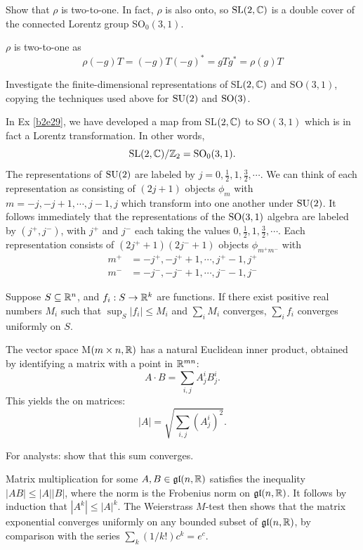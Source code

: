 \documentclass[10pt]{article}
\begin{document}
\begin{example}
	Show that $\rho$ is two-to-one. In fact, $\rho$ is also onto, so $\text{SL}(2,\mathbb{C})$ is a double cover of the connected Lorentz group SO$_0(3,1)$.
\end{example}
\sol $\rho$ is two-to-one as
$$
\rho(-g)T = (-g)T(-g)^* = gTg^* = \rho(g)T
$$


\begin{example}
	Investigate the finite-dimensional representations of SL$(2,\mathbb{C})$ and SO$(3,1)$, copying the techniques used above for $\text{SU}(2)$ and $\text{SO}(3)$.
\end{example}
\sol In Ex \ref{b2e29}, we have developed a map from SL$(2,\mathbb{C})$ to SO$(3,1)$ which is in fact a Lorentz transformation. In other words,
$$
\text{SL}(2,\mathbb{C})/\mathbb{Z}_2 = \text{SO}_0(3,1).
$$
The representations of $\text{SU}(2)$ are labeled by $j = 0,\frac12,1,\frac32,\cdots$. We can think of each representation as consisting of $(2j + 1)$ objects $\phi_m$ with $m = -j, -j + 1,\cdots,j - 1, j$ which transform into one another under $\text{SU}(2)$. It follows immediately that the representations of the $\text{SO}(3,1)$ algebra are labeled by $(j^+,j^-)$, with $j^+$ and $j^-$ each taking the values $0,\frac12,1,\frac32,\cdots$. Each representation consists of $(2j^+ + 1)(2j^- + 1)$ objects $\phi_{m^+m^-}$ with
$$
\begin{aligned}
	m^+ &= -j^+, -j^+ + 1,\cdots,j^+ - 1, j^+\\
	m^- &= -j^-, -j^- + 1,\cdots,j^- - 1, j^-
\end{aligned}
$$


\begin{definition}
	 Suppose $S \subseteq \mathbb{R}^n$, and $f_i:S\to\mathbb{R}^k$ are functions. If there exist positive real numbers $M_i$ such that $\sup_S|f_i|\le M_i$ and $\sum_{i} M_i$ converges, $\sum_{i} f_i$ converges uniformly on $S$.
\end{definition}
 

\begin{definition}
	The vector space M$(m\times n,\mathbb{R})$ has a natural Euclidean inner product, obtained by identifying a matrix with a point in $\mathbb{R}^{mn}$:
	$$
	A\cdot B = \sum_{i,j} A_j^iB_j^i.
	$$
	This yields the  on matrices:
	$$
	|A| = \sqrt{\sum_{i,j} (A_j^i)^2}.
	$$
\end{definition}


\begin{example}
	For analysts: show that this sum converges.
\end{example}
\sol Matrix multiplication for some $A,B \in \mathfrak{gl}(n,\mathbb{R})$ satisfies the inequality $|AB| \le |A||B|$, where the norm is the Frobenius norm on $\mathfrak{gl}(n,\mathbb{R})$. It follows by induction that $|A^k| \le |A|^k$. The Weierstrass $M$-test then shows that the matrix exponential converges uniformly on any bounded subset of $\mathfrak{gl}(n,\mathbb{R})$, by comparison with the series $\sum_k(1/k!)c^k=e^c$.
\end{document}
